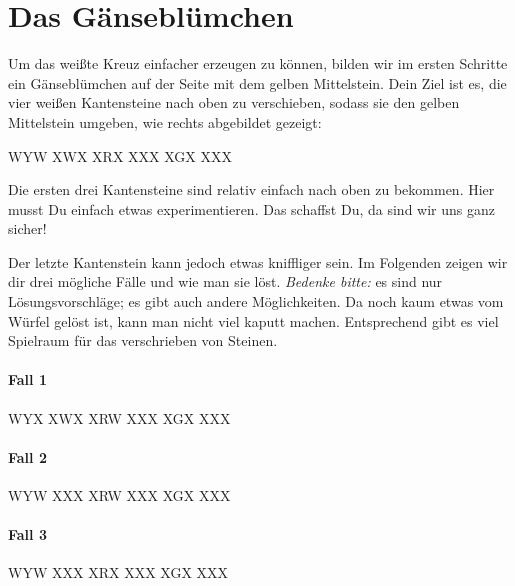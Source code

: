 \section{Das Gänseblümchen}

\parbox{0.7\linewidth}{
  Um das weißte Kreuz einfacher erzeugen zu können, bilden wir im ersten Schritte ein Gänseblümchen auf der Seite mit dem gelben Mittelstein.
  Dein Ziel ist es, die vier weißen Kantensteine nach oben zu verschieben, sodass sie den gelben Mittelstein umgeben, wie rechts abgebildet gezeigt:\\[1em]
} \parbox{0.3\linewidth}{
  \RubikCubeGreyAll%
	      {W}{Y}{W}
	      {X}{W}{X}%
		 {X}{R}{X}
		 {X}{X}{X}%
		 {X}{G}{X}
		 {X}{X}{X}%
}

Die ersten drei Kantensteine sind relativ einfach nach oben zu bekommen.
Hier musst Du einfach etwas experimentieren.
Das schaffst Du, da sind wir uns ganz sicher!

Der letzte Kantenstein kann jedoch etwas kniffliger sein.
Im Folgenden zeigen wir dir drei mögliche Fälle und wie man sie löst.
\emph{Bedenke bitte:} es sind nur Lösungsvorschläge; es gibt auch andere Möglichkeiten.
Da noch kaum etwas vom Würfel gelöst ist, kann man nicht viel kaputt machen.
Entsprechend gibt es viel Spielraum für das verschrieben von Steinen.

\paragraph{Fall 1}
\RubikCubeGreyAll%
            {W}{Y}{X}
            {X}{W}{X}%
               {X}{R}{W}
	       {X}{X}{X}%
	       {X}{G}{X}
	       {X}{X}{X}%

\paragraph{Fall 2}
\RubikCubeGreyAll%
            {W}{Y}{W}
            {X}{X}{X}%
               {X}{R}{W}
	       {X}{X}{X}%
	       {X}{G}{X}
	       {X}{X}{X}%

\paragraph{Fall 3}
\RubikCubeGreyAll%
            {W}{Y}{W}
            {X}{X}{X}%
               {X}{R}{X}
	       {X}{X}{X}%
	       {X}{G}{X}
	       {X}{X}{X}%
